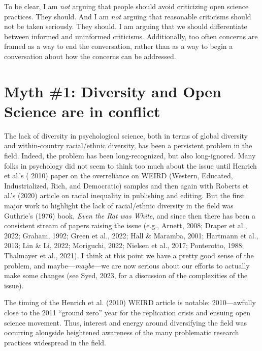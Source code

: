 \documentclass[authordate, empirical,issue]{jote-new-article}
\begin{document}
To be clear, I am \emph{not} arguing that people should avoid criticizing open science practices. They should. And I am \emph{not} arguing that reasonable criticisms should not be taken seriously. They should. I am arguing that we should differentiate between informed and uninformed criticisms. Additionally, too often concerns are framed as a way to end the conversation, rather than as a way to begin a conversation about how the concerns can be addressed.







\section{Myth \#1: Diversity and Open Science are in conflict}







The lack of diversity in psychological science, both in terms of global diversity and within-country racial/ethnic diversity, has been a persistent problem in the field. Indeed, the problem has been long-recognized, but also long-ignored. Many folks in psychology did not seem to think too much about the issue until Henrich et al.’s ( 2010) paper on the overreliance on WEIRD (Western, Educated, Industrialized, Rich, and Democratic) samples and then again with Roberts et al.’s (2020) article on racial inequality in publishing and editing. But the first major work to highlight the lack of racial/ethnic diversity in the field was Guthrie’s (1976) book, \emph{Even the Rat was White}, and since then there has been a consistent stream of papers raising the issue (e.g., Arnett, 2008; Draper et al., 2022; Graham, 1992; Green et al., 2022; Hall \& Maramba, 2001; Hartmann et al., 2013; Lin \& Li, 2022; Moriguchi, 2022; Nielsen et al., 2017; Ponterotto, 1988; Thalmayer et al., 2021). I think at this point we have a pretty good sense of the problem, and maybe—\emph{maybe}—we are now serious about our efforts to actually make some changes (see Syed, 2023, for a discussion of the complexities of the issue).







The timing of the Henrich et al. (2010) WEIRD article is notable: 2010—awfully close to the 2011 “ground zero” year for the replication crisis and ensuing open science movement. Thus, interest and energy around diversifying the field was occurring alongside heightened awareness of the many problematic research practices widespread in the field.
\end{document}
